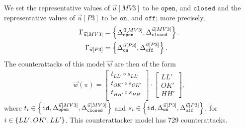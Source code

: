 {We set the representative values of $\vec{u}[MV3]$ to be $\texttt{open}$, and $\texttt{closed}$ and the representative values of $\vec{u}[P3]$ to be $\texttt{on}$, and $\texttt{off}$; more precisely, 
\begin{align*}
  \Gamma_{\vec{u}[MV3]}&=\left\{{\Delta}^{\vec{u}[MV3]}_{\texttt{open}}, {\Delta}^{\vec{u}[MV3]}_{\texttt{closed}}\right\}.\\
  \Gamma_{\vec{u}[P3]}&=\left\{{\Delta}^{\vec{u}[P3]}_{\texttt{on}}, {\Delta}^{\vec{u}[P3]}_{\texttt{off}}\right\}.
\end{align*}
The counterattacks of this model $\vec{w}$ are then of the form
\begin{align*}
  \vec{w}(\pi)=
  \begin{bmatrix}
    t_{LL'}\circ s_{LL'} \\
    t_{OK'}\circ s_{OK'} \\
    t_{HH'}\circ s_{HH'} \\
  \end{bmatrix}
  \cdot
  \begin{bmatrix}
    LL' \\
    OK' \\
    HH'
  \end{bmatrix},
\end{align*} 
where $t_i\in \left\{{\texttt{id}},{\Delta}^{\vec{u}[MV3]}_{\texttt{open}}, {\Delta}^{\vec{u}[MV3]}_{\texttt{closed}}\right\}$ and  $s_i\in\left\{{\texttt{id}},{\Delta}^{\vec{u}[P3]}_{\texttt{on}}, {\Delta}^{\vec{u}[P3]}_{\texttt{off}}\right\}$, for $i\in \left\{LL',OK',LL'\right\}$. This counterattacker model has 729 counterattacks.



}
